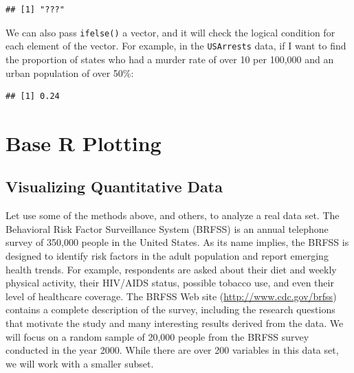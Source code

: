 \documentclass[
]{book}
\newenvironment{Shaded}{\begin{snugshade}}{\end{snugshade}}
\newcommand{\DecValTok}[1]{\textcolor[rgb]{0.00,0.00,0.81}{#1}}
\newcommand{\KeywordTok}[1]{\textcolor[rgb]{0.13,0.29,0.53}{\textbf{#1}}}
\newcommand{\NormalTok}[1]{#1}
\newcommand{\OperatorTok}[1]{\textcolor[rgb]{0.81,0.36,0.00}{\textbf{#1}}}
\newcommand{\OtherTok}[1]{\textcolor[rgb]{0.56,0.35,0.01}{#1}}
\newcommand{\StringTok}[1]{\textcolor[rgb]{0.31,0.60,0.02}{#1}}
\begin{document}
\begin{verbatim}
## [1] "???"
\end{verbatim}

We can also pass \texttt{ifelse()} a vector, and it will check the logical condition for each element of the vector. For example, in the \texttt{USArrests} data, if I want to find the proportion of states who had a murder rate of over 10 per 100,000 and an urban population of
over 50\%:

\begin{Shaded}
\end{Shaded}

\begin{verbatim}
## [1] 0.24
\end{verbatim}

\hypertarget{base-r-plotting}{%
\chapter{Base R Plotting}\label{base-r-plotting}}

\hypertarget{visualizing-quantitative-data}{%
\section{Visualizing Quantitative Data}\label{visualizing-quantitative-data}}

Let use some of the methods above, and others, to analyze a real data set. The Behavioral Risk Factor Surveillance System (BRFSS) is an annual telephone survey of 350,000 people in the United States. As its name implies, the BRFSS is designed to identify risk factors in the adult population and report emerging health trends. For example, respondents are asked about their diet and weekly physical activity, their HIV/AIDS status, possible tobacco use, and even their level of healthcare coverage. The BRFSS Web site (\url{http://www.cdc.gov/brfss}) contains a complete description of the survey, including the research questions that motivate the study and many interesting results derived from the data. We will focus on a random sample of 20,000 people from the BRFSS survey conducted in the year 2000. While there are over 200 variables in this data set, we will work with a smaller subset.
\end{document}
